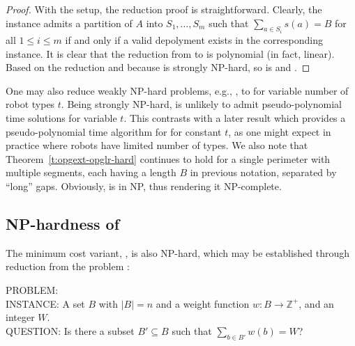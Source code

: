 \begin{proof}
	With the setup, the reduction proof is straightforward. Clearly, the 
	\tpart instance admits a partition of $A$ into $S_1, \ldots, 
	S_m$ such that $\sum_{a \in S_i} s(a) = B$ for all $1\leq i\leq m$ 
	if and only if a
	valid depolyment exists in the corresponding \opglrd instance. 
	It is clear that the reduction from \tpart to 
	\opglrd is polynomial (in fact, linear). Based on the 
	reduction and because \tpart is strongly NP-hard, so is \opglrd 
	and \opglr.
\end{proof}

\begin{remark}
	One may also reduce weakly NP-hard problems, e.g., \twopart
	\cite{karp1972reducibility}, to \opglr for variable number of robot 
	types $t$. Being strongly NP-hard, \opglr is unlikely to admit pseudo-polynomial 
	time solutions for variable $t$. This contrasts with a later result 
	which provides a pseudo-polynomial time algorithm for \opglr for 
	constant $t$, as one might expect in practice where robots have limited 
	number of types. We also note that Theorem~\ref{t:opgext-opglr-hard} continues 
	to hold for a single perimeter with multiple segments, each 
	having a length $B$ in previous notation, separated by ``long'' gaps. Obviously, 
	\opglrd is in NP, thus rendering it NP-complete. 
\end{remark}

\subsection{NP-hardness of \opgmc}
The minimum cost \opg variant, \opgmc, is also NP-hard, which may be 
established through reduction from the \subsetsum problem 
\cite{karp1972reducibility}:

\vspace*{1mm}
\noindent
PROBLEM: \subsetsum \\
INSTANCE: A set $B$ with $|B| = n$ and a weight function $w: B \to 
\mathbb Z^+$, and an integer $W$.\\ 
QUESTION: Is there a subset $B' \subseteq B$ such that $\sum_{b \in B'} 
w(b) = W$?
\vspace*{1mm}

